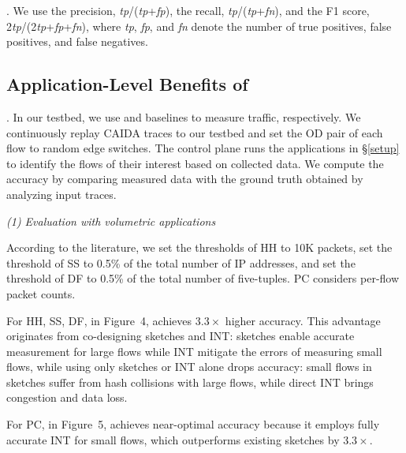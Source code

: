 . We use the precision, \emph{tp}/(\emph{tp}+\emph{fp}), the recall, \emph{tp}/(\emph{tp}+\emph{fn}), and the F1 score, 2\emph{tp}/(2\emph{tp}+\emph{fp}+\emph{fn}), where \emph{tp}, \emph{fp}, and \emph{fn} denote the number of true positives, false positives, and false negatives. 

\subsection{Application-Level Benefits of \sysname}

. 
In our testbed, we use \sysname and baselines to measure traffic, respectively. We continuously replay CAIDA traces \cite{caida} to our testbed and set the OD pair of each flow to random edge switches. The control plane runs the applications in \S\ref{setup} to identify the flows of their interest based on collected data. We compute the accuracy by comparing measured data with the ground truth obtained by analyzing input traces. 


\noindent \emph{(1) Evaluation with volumetric applications}

According to the literature, we set the thresholds of HH to 10K packets, set the threshold of SS to 0.5\% of the total number of IP addresses, and set the threshold of DF to 0.5\% of the total number of five-tuples. PC considers per-flow packet counts. 

For HH, SS, DF, in Figure~4, \sysname achieves $3.3\times$ higher accuracy. This advantage originates from co-designing sketches and INT: sketches enable accurate measurement for large flows while INT mitigate the errors of measuring small flows, while using only sketches or INT alone drops accuracy: small flows in sketches suffer from hash collisions with large flows, while direct INT brings congestion and data loss. 

For PC, in Figure~5, \sysname achieves near-optimal accuracy because it employs fully accurate INT for small flows, which outperforms existing sketches by $3.3\times$.  

